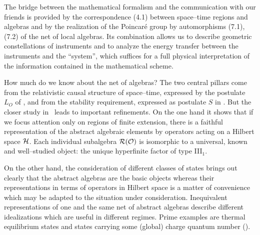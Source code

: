 The bridge between the mathematical formalism and the communication
with our friends is provided by the correspondence (4.1) between
space--time regions and algebras and by the realization of the 
Poincar\'e group by automorphisms (7.1), (7.2) of the net of local algebras.
Its combination allows us to describe geometric constellations of
instruments and to analyze the energy transfer between the 
instruments and the ``system'', which suffices for a full
physical interpretation of the information contained in the
mathematical scheme.  

How much do we know about the net of algebras? The two central 
pillars come from the relativistic causal structure of space--time,
expressed by the postulate $L_O$ of \secthr, and from the 
stability requirement, expressed as postulate $S$ in \sectwo.
But the closer study in \secfiv\ leads to important refinements. 
On the one hand it shows that if we focus attention only on regions
of finite extension, there is a faithful representation of the abstract
algebraic elements by operators acting on a Hilbert space $\cal H$.
Each individual subalgebra ${\cal R}({\cal O})$ is 
isomorphic to a universal, 
known and well--studied object: the unique hyperfinite factor of 
type III$_1$. 

On the other hand, the consideration of different classes of states 
brings out clearly that the abstract algebras are the basic objects
whereas their representations in terms of operators in Hilbert space
is a matter of convenience which may be adapted to the situation 
under consideration. Inequivalent representations of one and the 
same net of abstract algebras describe different idealizations which
are useful in different regimes. Prime examples are thermal  
equilibrium states and states carrying some (global) charge quantum
number (\secsix). 


